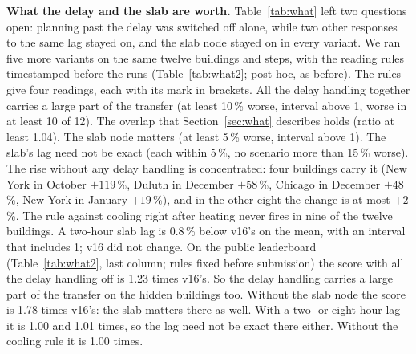 \documentclass{article}
\begin{document}
\textbf{What the delay and the slab are worth.} Table~\ref{tab:what} left two questions open: planning past the delay
was switched off alone, while two other responses to the same lag stayed on, and the slab node stayed on in every
variant. We ran five more variants on the same twelve buildings and steps, with the reading rules timestamped before
the runs (Table~\ref{tab:what2}; post hoc, as before). The rules give four readings, each with its mark in brackets.
All the delay handling together carries a large part of the transfer (at least 10\,\% worse, interval above 1, worse
in at least 10 of 12). The overlap that Section~\ref{sec:what} describes holds (ratio at least 1.04). The slab node
matters (at least 5\,\% worse, interval above 1). The slab's lag need not be exact (each within 5\,\%, no scenario
more than 15\,\% worse). The rise without any
delay handling is concentrated: four buildings carry it (New York in October $+119$\,\%, Duluth in December $+58$\,\%,
Chicago in December $+48$\,\%, New York in January $+19$\,\%), and in the other eight the change is at most $+2$\,\%.
The rule against cooling right after heating never fires in nine of the twelve buildings. A two-hour slab lag is
0.8\,\% below v16's on the mean, with an interval that includes 1; v16 did not change.
On the public leaderboard (Table~\ref{tab:what2}, last column; rules fixed before submission) the score with all the
delay handling off is 1.23 times v16's. So the delay handling carries a large part of the transfer on the hidden
buildings too. Without the slab node the score is 1.78 times v16's: the slab matters there as well. With a two- or
eight-hour lag it is 1.00 and 1.01 times, so the lag need not be exact there either. Without the cooling rule it is
1.00 times.
\end{document}
